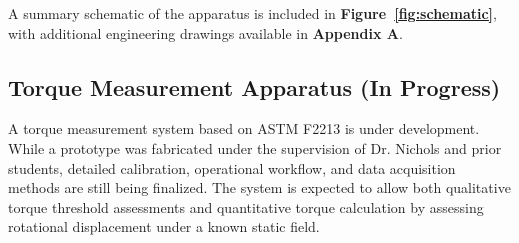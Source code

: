 A summary schematic of the apparatus is included in \textbf{Figure~\ref{fig:schematic}}, with additional engineering drawings available in \textbf{Appendix A}.


\subsection{Torque Measurement Apparatus (In Progress)}

A torque measurement system based on ASTM F2213 is under development. While a prototype was fabricated under the supervision of Dr. Nichols and prior students, detailed calibration, operational workflow, and data acquisition methods are still being finalized. The system is expected to allow both qualitative torque threshold assessments and quantitative torque calculation by assessing rotational displacement under a known static field.

